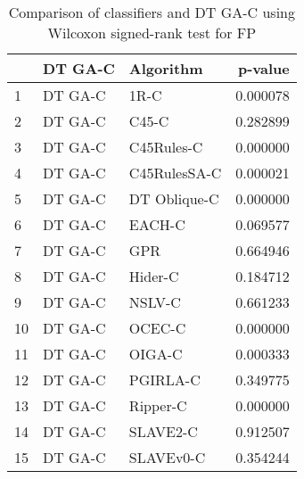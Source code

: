 \begin{table}
\footnotesize
\caption{Comparison of classifiers and DT GA-C using Wilcoxon signed-rank test for FP}
\label{tab:DT GA-C wilcoxon FP comparison}
\begin{tabular}{lllr}
\hline
 & DT GA-C & Algorithm & p-value \\
\hline
1 & DT GA-C & 1R-C & 0.000078 \\
2 & DT GA-C & C45-C & 0.282899 \\
3 & DT GA-C & C45Rules-C & 0.000000 \\
4 & DT GA-C & C45RulesSA-C & 0.000021 \\
5 & DT GA-C & DT Oblique-C & 0.000000 \\
6 & DT GA-C & EACH-C & 0.069577 \\
7 & DT GA-C & GPR & 0.664946 \\
8 & DT GA-C & Hider-C & 0.184712 \\
9 & DT GA-C & NSLV-C & 0.661233 \\
10 & DT GA-C & OCEC-C & 0.000000 \\
11 & DT GA-C & OIGA-C & 0.000333 \\
12 & DT GA-C & PGIRLA-C & 0.349775 \\
13 & DT GA-C & Ripper-C & 0.000000 \\
14 & DT GA-C & SLAVE2-C & 0.912507 \\
15 & DT GA-C & SLAVEv0-C & 0.354244 \\
\hline
\end{tabular}
\end{table}
